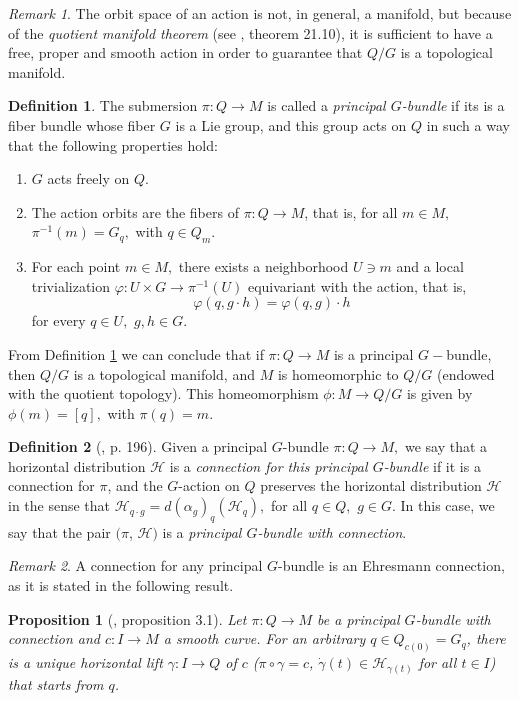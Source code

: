 \documentclass[12pt, letterpaper, reqno]{amsart}
\theoremstyle{definition}
\newtheorem{df}{Definition}
\theoremstyle{plain}
\newtheorem{prop}{Proposition}
\theoremstyle{remark}
\newtheorem{rem}{Remark}
\begin{document}
\begin{rem}
The orbit space of an action is not, in general, a manifold, but because of the \textit{quotient manifold theorem} (see \cite{lee2003introduction}, theorem 21.10), it is sufficient to have a free, proper and smooth action in order to guarantee that $ Q/G $ is a topological manifold.
\end{rem}
\begin{df}\label{df:principalGbundle}
	The submersion $ \pi: Q \rightarrow M$  is called a \textit{principal $ G $-bundle} if its is a fiber bundle whose fiber $ G $ is a Lie group, and this group acts on $ Q $ in such a way that the following properties hold:
	\begin{enumerate}
		\item $ G $ acts freely on $ Q $.
		\item The action orbits are the fibers of $ \pi:Q \rightarrow {M} $, that is, for all $ m\in M, $ $ \pi^{-1}(m) = G_q, $ with $ q\in Q_m. $ 
		\item For each point $ m\in M, $ there exists a neighborhood $ U\ni m $ and a local trivialization $ \varphi: U\times G \rightarrow \pi^{-1}(U)$ equivariant with the action, that is,
			$$ \varphi(q, g\cdot h)=\varphi(q,g)\cdot h  $$ 
			for every $ q\in U, $ $ g,h\in G. $ 
	\end{enumerate}
\end{df}

From Definition \ref{df:principalGbundle} we can conclude that if $ \pi: Q \rightarrow M $ is a principal $ G- $bundle, then $Q/G  $ is a topological manifold, and $M $ is homeomorphic to $ Q/G $ (endowed with the quotient topology). This homeomorphism $ \phi: M \rightarrow {Q/G}$  is given by $ \phi(m)=[q], $ with $ \pi(q)=m. $ 

\begin{df}[\cite{montgomery2002tour}, p. 196]
	Given a principal $ G $-bundle $ \pi: Q \rightarrow M, $ we say that a horizontal distribution $ \mathcal{H} $ is a \textit{connection for this principal $ G $-bundle} if it is a connection for $ \pi $, and the $ G $-action on $ Q $ preserves the horizontal distribution $ \mathcal{H} $ in the sense that $ \mathcal{H}_{q\cdot g} = d(\alpha_g)_q (\mathcal{H}_q), $ for all $ q\in Q, $ $ g\in G $. In this case, we say that the pair $ (\pi$, $ \mathcal{H}) $ is a \textit{principal $ G $-bundle with connection}. 

\end{df}

\begin{rem}
A connection for any principal $ G $-bundle is an Ehresmann connection, as it is stated in the following result. 
\end{rem}
\begin{prop}[\cite{kobayashi1963foundations}, proposition 3.1]\label{prop:comp_bundle}
	Let $ \pi: Q \rightarrow M $ be a principal $ G $-bundle with connection and $ c: I \rightarrow M $ a smooth curve. For an arbitrary $ q\in Q_{c(0)}= G_q $, there is a unique horizontal lift $ \gamma: I \rightarrow Q $ of $ c $ ($\pi\circ\gamma =c$, $ \dot{\gamma}(t)\in \mathcal{H}_{\gamma(t)} $ for all $ t\in I $) that starts from $ q $.    	
\end{prop}
\end{document}
